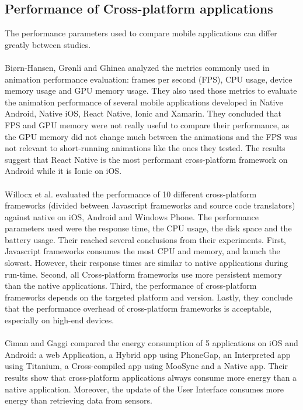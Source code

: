\documentclass{kththesis}
\begin{document}
\subsection{Performance of Cross-platform applications}

The performance parameters used to compare mobile applications can differ greatly between studies. 

\paragraph{}
Biørn-Hansen, Grønli and Ghinea \cite{animation_performance} analyzed the metrics commonly used in animation performance evaluation: frames per second (FPS), CPU usage, device memory usage and GPU memory usage. They also used those metrics to evaluate the animation performance of several mobile applications developed in Native Android, Native iOS, React Native, Ionic and Xamarin. They concluded that FPS and GPU memory were not really useful to compare their performance, as the GPU memory did not change much between the animations and the FPS was not relevant to short-running animations like the ones they tested. The results suggest that React Native is the most performant cross-platform framework on Android while it is Ionic on iOS.
\paragraph{}
Willocx et al. \cite{willocx2016comparing} evaluated the performance of 10 different cross-platform frameworks (divided between Javascript frameworks and source code translators) against native on iOS, Android and Windows Phone. The performance parameters used were the response time, the CPU usage, the disk space and the battery usage. Their reached several conclusions from their experiments. First, Javascript frameworks consumes the most CPU and memory, and launch the slowest. However, their response times are similar to native applications during run-time. Second, all Cross-platform frameworks use more persistent memory than the native applications. Third, the performance of cross-platform frameworks depends on the targeted platform and version. Lastly, they conclude that the performance overhead of cross-platform frameworks is acceptable, especially on high-end devices. 

\paragraph{}
Ciman and Gaggi \cite{ciman2017empirical} compared the energy consumption of 5 applications on iOS and Android: a web Application, a Hybrid app using PhoneGap, an Interpreted app using Titanium, a Cross-compiled app using MooSync and a Native app. Their results show that cross-platform applications always consume more energy than a native application. Moreover, the update of the User Interface consumes more energy than retrieving data from sensors. 
\end{document}

